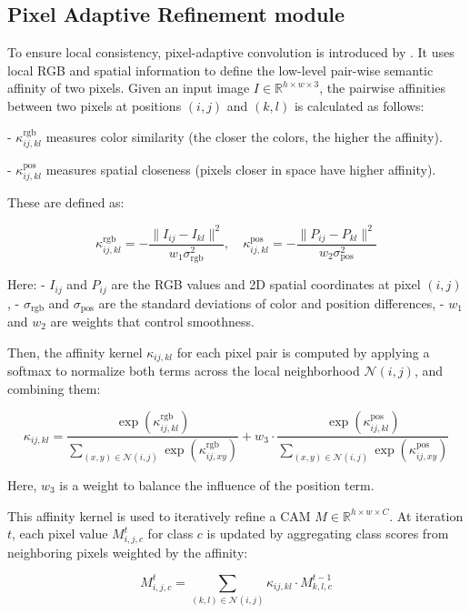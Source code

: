 \subsection{Pixel Adaptive Refinement module}
\label{subsec:par}
To ensure local consistency, pixel-adaptive convolution is introduced by \cite{wsss_afa_affinity_from_attention}. It uses local RGB and spatial information to define the low-level pair-wise semantic affinity of two pixels. Given an input image \( I \in \mathbb{R}^{h \times w \times 3} \), the pairwise affinities between two pixels at positions \((i, j)\) and \((k, l)\) is calculated as follows:

- \( \kappa^{\text{rgb}}_{ij,kl} \) measures color similarity (the closer the colors, the higher the affinity).

- \( \kappa^{\text{pos}}_{ij,kl} \) measures spatial closeness (pixels closer in space have higher affinity).

These are defined as:

\[
    \kappa^{\text{rgb}}_{ij,kl} = -\frac{\| I_{ij} - I_{kl} \|^2}{w_1 \sigma^2_{\text{rgb}}}, \quad
    \kappa^{\text{pos}}_{ij,kl} = -\frac{\| P_{ij} - P_{kl} \|^2}{w_2 \sigma^2_{\text{pos}}}
\]

Here:
- \( I_{ij} \) and \( P_{ij} \) are the RGB values and 2D spatial coordinates at pixel \((i, j)\),
- \( \sigma_{\text{rgb}} \) and \( \sigma_{\text{pos}} \) are the standard deviations of color and position differences,
- \( w_1 \) and \( w_2 \) are weights that control smoothness.

Then, the affinity kernel \( \kappa_{ij,kl} \) for each pixel pair is computed by applying a softmax to normalize both terms across the local neighborhood \( \mathcal{N}(i, j) \), and combining them:

\[
    \kappa_{ij,kl} = \frac{ \exp(\kappa^{\text{rgb}}_{ij,kl}) }{ \sum\limits_{(x, y) \in \mathcal{N}(i, j)} \exp(\kappa^{\text{rgb}}_{ij,xy}) }
    + w_3 \cdot \frac{ \exp(\kappa^{\text{pos}}_{ij,kl}) }{ \sum\limits_{(x, y) \in \mathcal{N}(i, j)} \exp(\kappa^{\text{pos}}_{ij,xy}) }
\]

Here, \( w_3 \) is a weight to balance the influence of the position term.

This affinity kernel is used to iteratively refine a CAM \( M \in \mathbb{R}^{h \times w \times C} \). At iteration \( t \), each pixel value \( M^t_{i,j,c} \) for class \( c \) is updated by aggregating class scores from neighboring pixels weighted by the affinity:

\begin{equation}
    M^t_{i,j,c} = \sum_{(k, l) \in \mathcal{N}(i, j)} \kappa_{ij,kl} \cdot M^{t-1}_{k,l,c}
\end{equation}



